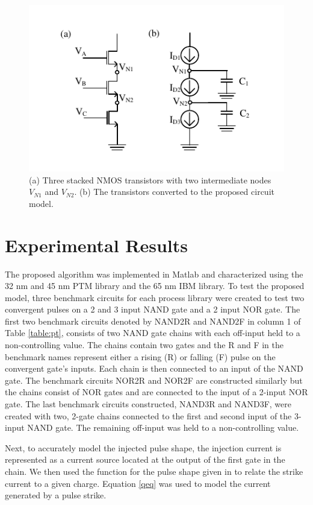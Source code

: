 \begin{figure}[!htbp]
	\centering
	\includegraphics[width=0.70\linewidth]{Figures/Stacked}
	\caption{(a) Three stacked NMOS transistors with two intermediate nodes $V_{N1}$ and $V_{N2}$. (b) The transistors converted to the proposed circuit model.}
	\label{StackT}
\end{figure}

\section{Experimental Results}

The proposed algorithm was implemented in Matlab and characterized using the 32 nm and 45 nm PTM library \cite{PTM} and the 65 nm IBM library. To test the proposed model, three benchmark circuits for each process library were created to test two convergent pulses on a 2 and 3 input NAND gate and a 2 input NOR gate. The first two benchmark circuits denoted by NAND2R and NAND2F in column 1 of Table \ref{table:pt}, consists of two NAND gate chains with each off-input held to a non-controlling value. The chains contain two gates and the R and F in the benchmark names represent either a rising (R) or falling (F) pulse on the convergent gate’s inputs. Each chain is then connected to an input of the NAND gate. The benchmark circuits NOR2R and NOR2F are constructed similarly but the chains consist of NOR gates and are connected to the input of a 2-input NOR gate. The last benchmark circuits constructed, NAND3R and NAND3F, were created with two, 2-gate chains connected to the first and second input of the 3-input NAND gate. The remaining off-input was held to a non-controlling value. 

Next, to accurately model the injected pulse shape, the injection current is represented as a current source located at the output of the first gate in the chain. We then used the function for the pulse shape given in \cite{injeq} to relate the strike current to a given charge. Equation \ref{qeq} was used to model the current generated by a pulse strike.

